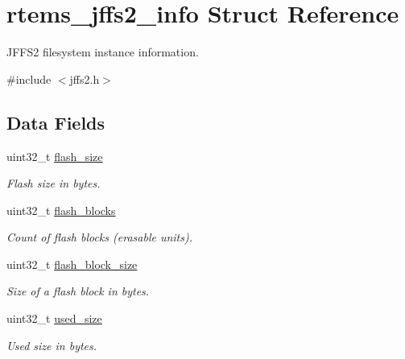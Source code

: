\hypertarget{structrtems__jffs2__info}{}\section{rtems\+\_\+jffs2\+\_\+info Struct Reference}
\label{structrtems__jffs2__info}


J\+F\+F\+S2 filesystem instance information.  




{\ttfamily \#include $<$jffs2.\+h$>$}

\subsection*{Data Fields}
\begin{DoxyCompactItemize}
\item 
\mbox{\label{structrtems__jffs2__info_a8c37cba24c8a3731fde6df070c592cae}} 
uint32\+\_\+t \mbox{\hyperlink{structrtems__jffs2__info_a8c37cba24c8a3731fde6df070c592cae}{flash\+\_\+size}}
\begin{DoxyCompactList}\small\item\em Flash size in bytes. \end{DoxyCompactList}\item 
\mbox{\label{structrtems__jffs2__info_a2c699da9a62b5793b35d0e843af01226}} 
uint32\+\_\+t \mbox{\hyperlink{structrtems__jffs2__info_a2c699da9a62b5793b35d0e843af01226}{flash\+\_\+blocks}}
\begin{DoxyCompactList}\small\item\em Count of flash blocks (erasable units). \end{DoxyCompactList}\item 
\mbox{\label{structrtems__jffs2__info_a117f3131c8df95d7add08574e47ede7a}} 
uint32\+\_\+t \mbox{\hyperlink{structrtems__jffs2__info_a117f3131c8df95d7add08574e47ede7a}{flash\+\_\+block\+\_\+size}}
\begin{DoxyCompactList}\small\item\em Size of a flash block in bytes. \end{DoxyCompactList}\item 
uint32\+\_\+t \mbox{\hyperlink{structrtems__jffs2__info_a9f7716c0573cb59d88a1f958b3b9ae19}{used\+\_\+size}}
\begin{DoxyCompactList}\small\item\em Used size in bytes. \end{DoxyCompactList}\item 

\end{DoxyCompactItemize}

